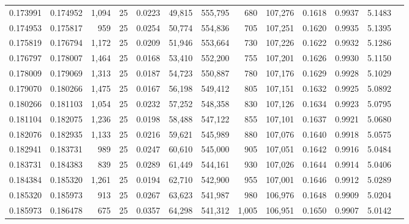 \begin{tabular}{rrrrrrrrrrrrr}
0.173991 & 0.174952 & 1,094 &  25 &                                     0.0223 &  49,815 & 555,795 &     680 & 107,276 & 0.1618 & 0.9937 & 5.1483 \\
0.174953 & 0.175817 &   959 &  25 &                                     0.0254 &  50,774 & 554,836 &     705 & 107,251 & 0.1620 & 0.9935 & 5.1395 \\
0.175819 & 0.176794 & 1,172 &  25 &                                     0.0209 &  51,946 & 553,664 &     730 & 107,226 & 0.1622 & 0.9932 & 5.1286 \\
0.176797 & 0.178007 & 1,464 &  25 &                                     0.0168 &  53,410 & 552,200 &     755 & 107,201 & 0.1626 & 0.9930 & 5.1150 \\
0.178009 & 0.179069 & 1,313 &  25 &                                     0.0187 &  54,723 & 550,887 &     780 & 107,176 & 0.1629 & 0.9928 & 5.1029 \\
0.179070 & 0.180266 & 1,475 &  25 &                                     0.0167 &  56,198 & 549,412 &     805 & 107,151 & 0.1632 & 0.9925 & 5.0892 \\
0.180266 & 0.181103 & 1,054 &  25 &                                     0.0232 &  57,252 & 548,358 &     830 & 107,126 & 0.1634 & 0.9923 & 5.0795 \\
0.181104 & 0.182075 & 1,236 &  25 &                                     0.0198 &  58,488 & 547,122 &     855 & 107,101 & 0.1637 & 0.9921 & 5.0680 \\
0.182076 & 0.182935 & 1,133 &  25 &                                     0.0216 &  59,621 & 545,989 &     880 & 107,076 & 0.1640 & 0.9918 & 5.0575 \\
0.182941 & 0.183731 &   989 &  25 &                                     0.0247 &  60,610 & 545,000 &     905 & 107,051 & 0.1642 & 0.9916 & 5.0484 \\
0.183731 & 0.184383 &   839 &  25 &                                     0.0289 &  61,449 & 544,161 &     930 & 107,026 & 0.1644 & 0.9914 & 5.0406 \\
0.184384 & 0.185320 & 1,261 &  25 &                                     0.0194 &  62,710 & 542,900 &     955 & 107,001 & 0.1646 & 0.9912 & 5.0289 \\
0.185320 & 0.185973 &   913 &  25 &                                     0.0267 &  63,623 & 541,987 &     980 & 106,976 & 0.1648 & 0.9909 & 5.0204 \\
0.185973 & 0.186478 &   675 &  25 &                                     0.0357 &  64,298 & 541,312 &   1,005 & 106,951 & 0.1650 & 0.9907 & 5.0142 \\

\end{tabular}
